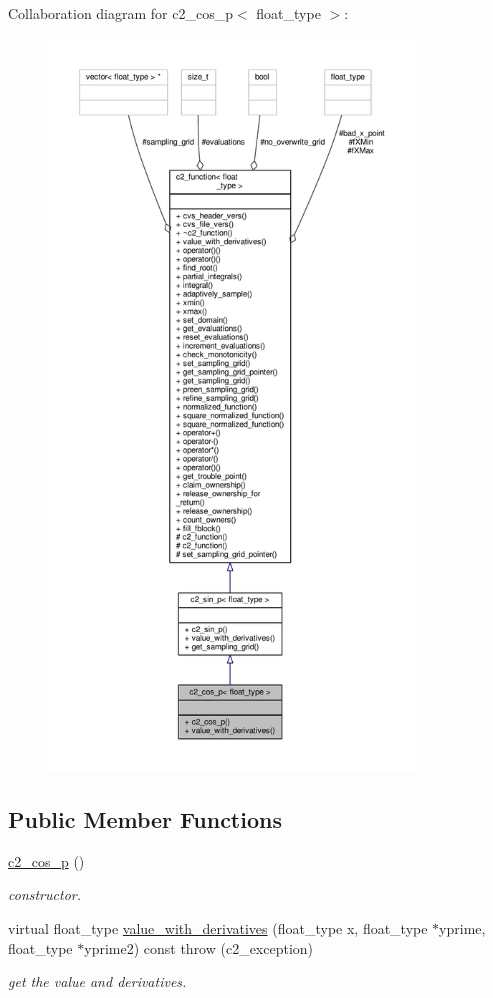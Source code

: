 Collaboration diagram for c2\+\_\+cos\+\_\+p$<$ float\+\_\+type $>$\+:
\nopagebreak
\begin{figure}[H]
\begin{center}
\leavevmode
\includegraphics[height=550pt]{classc2__cos__p__coll__graph}
\end{center}
\end{figure}
\subsection*{Public Member Functions}
\begin{DoxyCompactItemize}
\item 
\hyperlink{classc2__cos__p_a407476ff0daa92ac2267e754b74ae133}{c2\+\_\+cos\+\_\+p} ()
\begin{DoxyCompactList}\small\item\em constructor. \end{DoxyCompactList}\item 
virtual float\+\_\+type \hyperlink{classc2__cos__p_ae4e275f2739d33bfbf1f2efc741535d5}{value\+\_\+with\+\_\+derivatives} (float\+\_\+type x, float\+\_\+type $\ast$yprime, float\+\_\+type $\ast$yprime2) const   throw (c2\+\_\+exception)
\begin{DoxyCompactList}\small\item\em get the value and derivatives. \end{DoxyCompactList}\end{DoxyCompactItemize}
